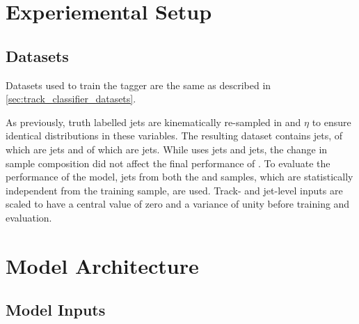 \section{Experiemental Setup}\label{sec:experimental_setup}

\subsection{Datasets}\label{sec:datasets}

Datasets used to train the \GNN tagger are the same as described in \cref{sec:track_classifier_datasets}.

As previously, truth labelled \bcl jets are kinematically re-sampled in \pt and $\eta$ to ensure identical distributions in these variables. 
The resulting dataset contains \njetstrain jets,  of which are \ttbar jets and  of which are \Zprime jets.
While \DLr uses  \ttbar jets and  \Zprime jets, the change in sample composition did not affect the final performance of \GNN.
To evaluate the performance of the model, \njetsval jets from both the \ttbar and \Zprime samples, which are statistically independent from the training sample, are used. 
Track- and jet-level inputs are scaled to have a central value of zero and a variance of unity before training and evaluation. 


\section{Model Architecture}\label{sec:networks}

\subsection{Model Inputs}\label{sec:model-inputs}

\newcommand{\ipdefsfootnote}{%
Impact parameter significances are defined as the IP divided by its corresponding uncertainty, $\dzerosig = d_0 / \dzerouncert$ and $\zzerosig = z_0 / \zzerouncert$.
Track IP significances are lifetime signed according to the track's direction with respect to the jet axis and the primary vertex \cite{PERF-2012-04}.
}

